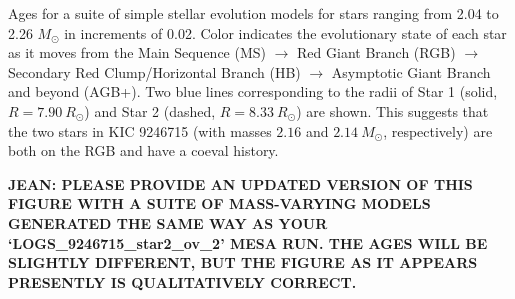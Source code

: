 \label{fig:mesa} Ages for a suite of simple stellar evolution models for stars ranging from 2.04 to 2.26 $M_{\odot}$ in increments of 0.02. Color indicates the evolutionary state of each star as it moves from the Main Sequence (MS) $\rightarrow$ Red Giant Branch (RGB) $\rightarrow$ Secondary Red Clump/Horizontal Branch (HB) $\rightarrow$ Asymptotic Giant Branch and beyond (AGB+). Two blue lines corresponding to the radii of Star 1 (solid, $R = 7.90 \ R_\odot$) and Star 2 (dashed, $R = 8.33 \ R_\odot$) are shown. This suggests that the two stars in KIC 9246715 (with masses $2.16$ and $2.14 \ M_\odot$, respectively) are both on the RGB and have a coeval history.

\textbf{JEAN: PLEASE PROVIDE AN UPDATED VERSION OF THIS FIGURE WITH A SUITE OF MASS-VARYING MODELS GENERATED THE SAME WAY AS YOUR `LOGS_9246715_star2_ov_2' MESA RUN. THE AGES WILL BE SLIGHTLY DIFFERENT, BUT THE FIGURE AS IT APPEARS PRESENTLY IS QUALITATIVELY CORRECT.}
  
  